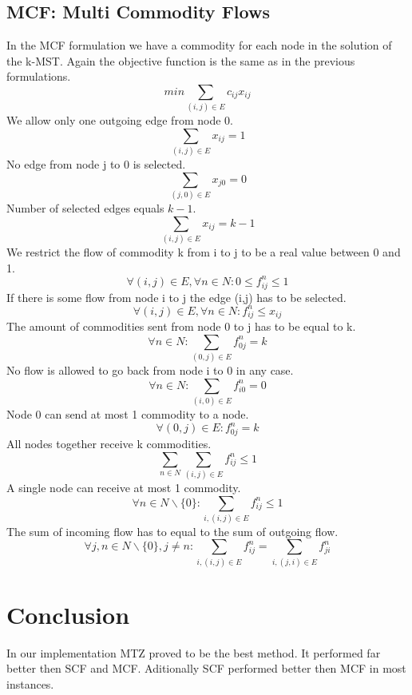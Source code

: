 \documentclass{article}
\begin{document}
\subsection{MCF: Multi Commodity Flows \label{mcf}}
In the MCF formulation we have a commodity for each node in the solution of the k-MST. Again the objective function is the same as in the previous formulations.
\setcounter{equation}{0}
\begin{equation}
min \sum_{(i,j) \in E} c_{ij} x_{ij}
\end{equation}
We allow only one outgoing edge from node 0.
\begin{equation}
\sum_{(i,j) \in E} x_{ij} = 1
\end{equation}
No edge from node j to 0 is selected.
\begin{equation}
\sum_{(j,0) \in E} x_{j0} = 0
\end{equation}
Number of selected edges equals $k-1$.
\begin{equation}
\sum_{(i,j) \in E} x_{ij} = k - 1
\end{equation}
We restrict the flow of commodity k from i to j to be a real value between 0 and 1.
\begin{equation}
\forall (i,j) \in E, \forall n \in N : 0 \le f_{ij}^{n} \le 1
\end{equation}
If there is some flow from node i to j the edge (i,j) has to be selected.
\begin{equation}
\forall (i,j) \in E, \forall n \in N : f_{ij}^{n} \le x_{ij} 
\end{equation}
The amount of commodities sent from node 0 to j has to be equal to k.
\begin{equation}
\forall n \in N: \sum_{(0,j) \in E} f_{0j}^{n} = k
\end{equation}
No flow is allowed to go back from node i to 0 in any case.
\begin{equation}
\forall n \in N: \sum_{(i,0) \in E} f_{i0}^{n} = 0
\end{equation}
Node 0 can send at most 1 commodity to a node.
\begin{equation}
\forall (0,j) \in E : f_{0j}^{n} = k
\end{equation}
All nodes together receive k commodities.
\begin{equation}
\sum_{n \in N} \sum_{(i,j) \in E} f_{ij}^{n} \le 1
\end{equation}
A single node can receive at most 1 commodity.
\begin{equation}
\forall n \in N \backslash \{0\} : \sum_{i,(i,j) \in E} f_{ij}^{n} \le 1
\end{equation}
The sum of incoming flow has to equal to the sum of outgoing flow.
\begin{equation}
\forall j,n \in N \backslash \{0\}, j \not= n : \sum_{i,(i,j) \in E} f_{ij}^{n} = \sum_{i,(j,i) \in E} f_{ji}^{n}
\end{equation}



\section{Conclusion}
In our implementation MTZ proved to be the best method. It performed far better then SCF and MCF. Aditionally SCF performed better then MCF in most instances.
\end{document}
